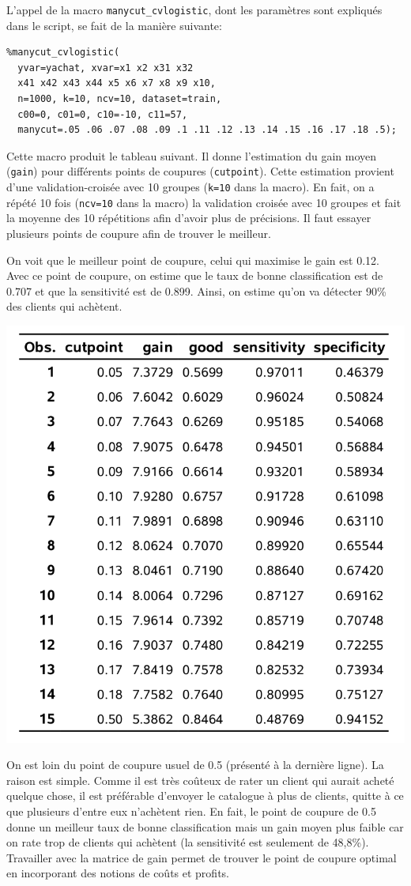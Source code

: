 \documentclass[
  11pt,
  letterpaper,
]{book}
\theoremstyle{definition}
\theoremstyle{definition}
\theoremstyle{definition}
\theoremstyle{remark}
\begin{document}
L'appel de la macro \texttt{manycut\_cvlogistic}, dont les paramètres sont expliqués dans le script, se fait de la manière suivante:

\begin{verbatim}
%manycut_cvlogistic(
  yvar=yachat, xvar=x1 x2 x31 x32 
  x41 x42 x43 x44 x5 x6 x7 x8 x9 x10,
  n=1000, k=10, ncv=10, dataset=train,
  c00=0, c01=0, c10=-10, c11=57,
  manycut=.05 .06 .07 .08 .09 .1 .11 .12 .13 .14 .15 .16 .17 .18 .5);
\end{verbatim}

Cette macro produit le tableau suivant. Il donne l'estimation du gain moyen (\texttt{gain}) pour différents points de coupures (\texttt{cutpoint}). Cette estimation provient d'une validation-croisée avec 10 groupes (\texttt{k=10} dans la macro). En fait, on a répété 10 fois (\texttt{ncv=10} dans la macro) la validation croisée avec 10 groupes et fait la moyenne des 10 répétitions afin d'avoir plus de précisions. Il faut essayer plusieurs points de coupure afin de trouver le meilleur.

On voit que le meilleur point de coupure, celui qui maximise le gain est 0.12. Avec ce point de coupure, on estime que le taux de bonne classification est de 0.707 et que la sensitivité est de 0.899. Ainsi, on estime qu'on va détecter 90\% des clients qui achètent.

\begin{center}\includegraphics[width=0.6\linewidth]{figures/03-logistic-e19} \end{center}

On est loin du point de coupure usuel de 0.5 (présenté à la dernière ligne). La raison est simple. Comme il est très coûteux de rater un client qui aurait acheté quelque chose, il est préférable d'envoyer le catalogue à plus de clients, quitte à ce que plusieurs d'entre eux n'achètent rien. En fait, le point de coupure de 0.5 donne un meilleur taux de bonne classification mais un gain moyen plus faible car on rate trop de clients qui achètent (la sensitivité est seulement de 48,8\%). Travailler avec la matrice de gain permet de trouver le point de coupure optimal en incorporant des notions de coûts et profits.
\end{document}
